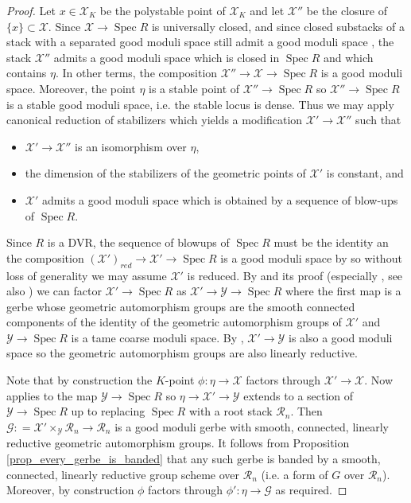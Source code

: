 \documentclass{amsart}
\theoremstyle{definition}
\newcommand{\cG}{\mathcal{G}}
\newcommand{\cX}{\mathcal{X}}
\newcommand{\cY}{\mathcal{Y}}
\newcommand{\cR}{\mathcal{R}}
\newcommand{\spec}{\operatorname{Spec}}
\begin{document}
\begin{proof} Let $x \in \cX_K$ be the polystable point of $\cX_K$ and let $\cX''$ be the closure of $\{x\}\subset \cX$. Since $\cX\to \spec R$ is universally closed, and since closed substacks of a stack with a separated good moduli space still admit a good moduli space \cite[Lemma 4.14]{Alper}, the stack $\cX''$ admits a good moduli space which is closed in $\spec R$ and which contains $\eta$. In other terms, the composition $\cX''\to \cX\to\spec R$ is a good moduli space. Moreover, the point $\eta$ is a stable point of $\cX'' \to \spec R$ so $\cX'' \to \spec R$ is a stable good moduli space, i.e. the stable locus is dense. Thus we may apply canonical reduction of stabilizers \cite{ER} which yields a modification $\cX' \to \cX''$ such that
\begin{itemize}
    \item $\cX'\to \cX''$ is an isomorphism over $\eta$,
    \item the dimension of the stabilizers of the geometric points of $\cX'$ is constant, and
    \item $\cX'$ admits a good moduli space which is obtained by a sequence of blow-ups of $\spec R$.
\end{itemize}
Since $R$ is a DVR, the sequence of blowups of $\spec R$ must be the identity an the composition $(\cX')_{red} \to \cX' \to \spec R$ is a good moduli space by \cite[Theorem 4.16(viii)]{Alper} so without loss of generality we may assume $\cX'$ is reduced. By \cite[Proposition B.2]{ER} and its proof (especially \cite[Proposition B.6]{ER}, see also \cite[Proposition 2.3]{bejleri2024proper}) we can factor $\cX'\to \spec R$ as $\cX'\to \cY \to \spec R$ where the first map is a gerbe whose geometric automorphism groups are the smooth connected components of the identity of the geometric automorphism groups of $\cX'$ and $\cY \to \spec R$ is a tame coarse moduli space. By \cite[Proposition 3.13]{Alper}, $\cX' \to \cY$ is also a good moduli space so the geometric automorphism groups are also linearly reductive. 

Note that by construction the $K$-point $\phi : \eta \to \cX$ factors through $\cX' \to \cX$.  Now \cite[Theorem 3.1]{bresciani2024arithmetic} applies to the map $\cY \to \spec R$ so $\eta \to \cX' \to \cY$ extends to a section of $\cY \to \spec R$ up to replacing $\spec R$ with a root stack $\cR_n$. Then $\cG \colon= \cX'\times_{\cY}\cR_n\to \cR_n$ is a good moduli gerbe with smooth, connected, linearly reductive geometric automorphism groups. It follows from Proposition \ref{prop_every_gerbe_is_banded} that any such gerbe is banded by a smooth, connected, linearly reductive group scheme over $\cR_n$ (i.e. a form of $G$ over $\cR_n$). Moreover, by construction $\phi$ factors through $\phi' : \eta \to \cG$ as required. 


\end{proof}
\end{document}
